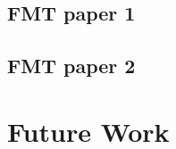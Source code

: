 \documentclass[12pt,chapterheads]{ucsd}
\begin{document}
\ifdefined\RELEASE
    
    
\else
    \section{FMT paper 1}\label{section_moviefmt}
    \section{FMT paper 2}\label{section_fmt}
\fi

\chapter{Future Work}






\printindex %


\end{document}
